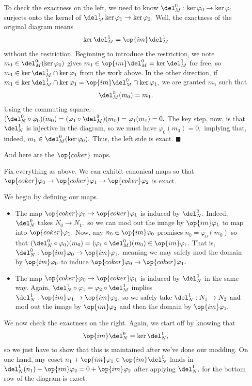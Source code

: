 To check the exactness on the left, we need to know $\del_M^0:\ker\varphi_0\to\ker\varphi_1$ surjects onto the kernel of $\del_M^1\ker\varphi_1\to\ker\varphi_2.$ Well, the exactness of the original diagram means
\[\ker\del_M^1=\op{im}\del_M^1\]
without the restriction. Beginning to introduce the restriction, we note $m_1\in\del_M^0(\ker\varphi_0)$ gives $m_1\in\op{im}\del_M^0=\ker\del_M^1$ for free, so $m_1\in\ker\del_M^1\cap\ker\varphi_1$ from the work above. In the other direction, if $m_1\in\ker\del_M^1\cap\ker\varphi_1=\op{im}\del_M^0\cap\ker\varphi_1,$ we are granted $m_1$ such that
\[\del_M^0(m_0)=m_1.\]
Using the commuting square, $(\del_N^0\circ\varphi_0)(m_0)=(\varphi_1\circ\del_M^0)(m_0)=\varphi_1(m_1)=0.$ The key step, now, is that $\del_N^1$ is injective in the diagram, so we must have $\varphi_0(m_0)=0,$ implying that, indeed, $m_1\in\del_M^0(\ker\varphi_0).$ Thus, the left side is exact. $\blacksquare$

And here are the $\op{coker}$ maps.
\begin{lemma}
    Fix everything as above. We can exhibit canonical maps so that $\op{coker}\varphi_0\to\op{coker}\varphi_1\to\op{coker}\varphi_2$ is exact.
\end{lemma}
We begin by defining our maps.
\begin{itemize}
    \item The map $\op{coker}\varphi_0\to\op{coker}\varphi_1$ is induced by $\del_N^0.$ Indeed, $\del_N^0$ takes $N_0\to N_1,$ so we can mod out the image by $\op{im}\varphi_1$ to map into $\op{coker}\varphi_1.$ Now, any $n_0\in\op{im}\varphi_0$ promises $n_0=\varphi_0(m_0)$ so that $(\del_N^0\circ\varphi_0)(m_0)=(\varphi_1\circ\del_M^0)(m_0)\in\op{im}\varphi_1.$ That is, $\del_N^0:\op{im}\varphi_0\to\op{im}\varphi_1,$ meaning we may safely mod the domain by $\op{im}\varphi_0$ to induce $\op{coker}\varphi_0\to\op{coker}\varphi_1.$
    \item The map $\op{coker}\varphi_0\to\op{coker}\varphi_1$ is induced by $\del_N^0$ in the same way. Again, $\del_N^1\circ\varphi_1=\varphi_2\circ\del_M^1$ implies $\del_N^1:\op{im}\varphi_1\to\op{im}\varphi_2,$ so we safely take $\del_N^1:N_1\to N_2$ and mod out the image by $\op{im}\varphi_2$ and then the domain by $\op{im}\varphi_1.$
\end{itemize}
We now check the exactness on the right. Again, we start off by knowing that
\[\op{im}\del_N^0=\ker\del_N^1,\]
so we just have to show that this is maintained after we've done our modding. On one hand, any coset $n_1+\op{im}\varphi_1\in\op{im}\del_N^0$ lands in $\del_N^1(n_1)+\op{im}\varphi_2=0+\op{im}\varphi_2$ after applying $\del_N^1,$ for the bottom row of the diagram is exact.

